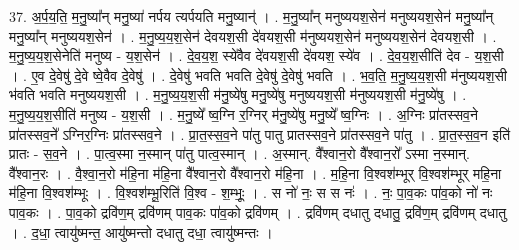 \documentclass[17pt]{extarticle}
\begin{document}
37. अ॒र्प॒य॒ति॒ म॒नु॒ष्या᳚न् मनु॒ष्या॑ नर्पय त्यर्पयति मनु॒ष्यान्॑ । . म॒नु॒ष्या᳚न् मनुष्ययश॒सेन॑ मनुष्ययश॒सेन॑ मनु॒ष्या᳚न् मनु॒ष्या᳚न् मनुष्ययश॒सेन॑ । . म॒नु॒ष्य॒य॒श॒सेन॑ देवयश॒सी दे॑वयश॒सी म॑नुष्ययश॒सेन॑ मनुष्ययश॒सेन॑ देवयश॒सी । . म॒नु॒ष्य॒य॒श॒सेनेति॑ मनुष्य - य॒श॒सेन॑ । . दे॒व॒य॒श॒ स्ये॑वैव दे॑वयश॒सी दे॑वयश॒ स्ये॑व । . दे॒व॒य॒श॒सीति॑ देव - य॒श॒सी । . ए॒व दे॒वेषु॑ दे॒वे ष्वे॒वैव दे॒वेषु॑ । . दे॒वेषु॑ भवति भवति दे॒वेषु॑ दे॒वेषु॑ भवति । . भ॒व॒ति॒ म॒नु॒ष्य॒य॒श॒सी म॑नुष्ययश॒सी भ॑वति भवति मनुष्ययश॒सी । . म॒नु॒ष्य॒य॒श॒सी म॑नु॒ष्ये॑षु मनु॒ष्ये॑षु मनुष्ययश॒सी म॑नुष्ययश॒सी म॑नु॒ष्ये॑षु । . म॒नु॒ष्य॒य॒श॒सीति॑ मनुष्य - य॒श॒सी । . म॒नु॒ष्ये᳚ ष्व॒ग्नि र॒ग्निर् म॑नु॒ष्ये॑षु मनु॒ष्ये᳚ ष्व॒ग्निः । . अ॒ग्निः प्रा॑तस्सव॒ने प्रा॑तस्सव॒ने᳚ ऽग्निर॒ग्निः प्रा॑तस्सव॒ने । . प्रा॒त॒स्स॒व॒ने पा॑तु पातु प्रातस्सव॒ने प्रा॑तस्सव॒ने पा॑तु । . प्रा॒त॒स्स॒व॒न इति॑ प्रातः - स॒व॒ने । . पा॒त्व॒स्मा न॒स्मान् पा॑तु पात्व॒स्मान् । . अ॒स्मान्. वै᳚श्वान॒रो वै᳚श्वान॒रो᳚ ऽस्मा न॒स्मान्. वै᳚श्वान॒रः । . वै॒श्वा॒न॒रो म॑हि॒ना म॑हि॒ना वै᳚श्वान॒रो वै᳚श्वान॒रो म॑हि॒ना । . म॒हि॒ना वि॒श्वश॑म्भूर् वि॒श्वश॑म्भूर् महि॒ना म॑हि॒ना वि॒श्वश॑म्भूः । . वि॒श्वश॑म्भू॒रिति॑ वि॒श्व - श॒म्भूः॒ । . स नो॑ नः॒ स स नः॑ । . नः॒ पा॒व॒कः पा॑व॒को नो॑ नः पाव॒कः । . पा॒व॒को द्रवि॑ण॒म् द्रवि॑णम् पाव॒कः पा॑व॒को द्रवि॑णम् । . द्रवि॑णम् दधातु दधातु॒ द्रवि॑ण॒म् द्रवि॑णम् दधातु । . द॒धा॒ त्वायु॑ष्मन्त॒ आयु॑ष्मन्तो दधातु दधा॒ त्वायु॑ष्मन्तः । \newline
\pagebreak
{}
\end{document}
